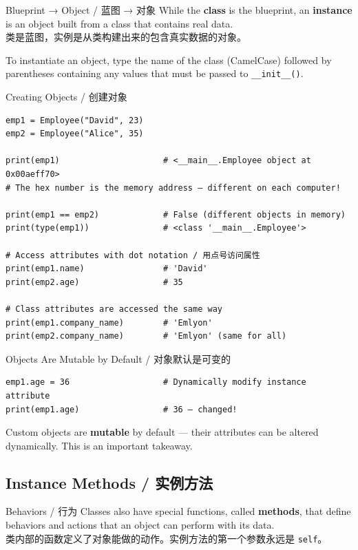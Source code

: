 \documentclass[11pt,a4paper]{article}
\begin{document}
\begin{concept}{Blueprint → Object / 蓝图 → 对象}
    While the \textbf{class} is the blueprint, an \textbf{instance} is an object built from a class that contains real data. \\
    类是蓝图，实例是从类构建出来的包含真实数据的对象。

    To instantiate an object, type the name of the class (CamelCase) followed by parentheses containing any values that must be passed to \texttt{\_\_init\_\_()}.
\end{concept}

\begin{examplebox}{Creating Objects / 创建对象}
\begin{lstlisting}
emp1 = Employee("David", 23)
emp2 = Employee("Alice", 35)

print(emp1)                     # <__main__.Employee object at 0x00aeff70>
# The hex number is the memory address — different on each computer!

print(emp1 == emp2)             # False (different objects in memory)
print(type(emp1))               # <class '__main__.Employee'>

# Access attributes with dot notation / 用点号访问属性
print(emp1.name)                # 'David'
print(emp2.age)                 # 35

# Class attributes are accessed the same way
print(emp1.company_name)        # 'Emlyon'
print(emp2.company_name)        # 'Emlyon' (same for all)
\end{lstlisting}
\end{examplebox}

\begin{warning}{Objects Are Mutable by Default / 对象默认是可变的}
    \begin{lstlisting}
emp1.age = 36                   # Dynamically modify instance attribute
print(emp1.age)                 # 36 — changed!
    \end{lstlisting}
    Custom objects are \textbf{mutable} by default — their attributes can be altered dynamically. This is an important takeaway.
\end{warning}

\subsection{Instance Methods / 实例方法}

\begin{concept}{Behaviors / 行为}
    Classes also have special functions, called \textbf{methods}, that define behaviors and actions that an object can perform with its data. \\
    类内部的函数定义了对象能做的动作。实例方法的第一个参数永远是 \texttt{self}。
\end{concept}
\end{document}
